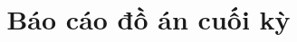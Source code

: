 %
%
%
% 
%
\title{Báo cáo đồ án cuối kỳ}

\documentclass[12pt]{article}
\usepackage[T5]{fontenc}
\usepackage[utf8]{inputenc}
\usepackage[vietnamese,english]{babel}
\usepackage{amsmath}
\usepackage{graphicx}
\usepackage[colorinlistoftodos]{todonotes}
\usepackage{listings}
\usepackage{hyperref}
\usepackage{indentfirst} %
\hypersetup{
    colorlinks=true,
    linkcolor=blue,
    filecolor=magenta,      
    urlcolor=cyan,
}




